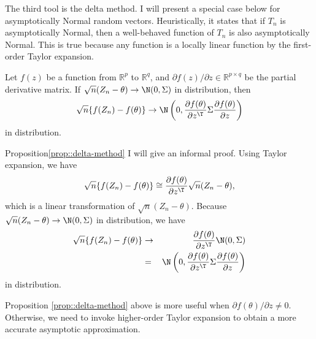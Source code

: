 The third tool is the delta method. I will present a special case below for asymptotically Normal random vectors. Heuristically, it states that if $T_n$ is asymptotically Normal, then a well-behaved function of $T_n$ is also asymptotically Normal. This is true because any function is a locally linear function by the first-order Taylor expansion. 

\begin{proposition}\label{prop::delta-method}
Let $f(z)$ be a function from $\mathbb{R}^p$ to $\mathbb{R}^q$, and $\partial f(z) / \partial z \in \mathbb{R}^{p\times q}$ be the partial derivative matrix. 
If $\sqrt{n} (Z_n - \theta) \rightarrow \N(0, \Sigma)$ in distribution, then 
$$
\sqrt{n} \{ f(Z_n) - f(\theta) \} \rightarrow \N\left( 
0, \frac{ \partial f(\theta) }{  \partial z^{\T} } \Sigma \frac{ \partial f(\theta) }{  \partial z}
\right)
$$
in distribution. 
\end{proposition}

\begin{myproof}{Proposition}{\ref{prop::delta-method}}
I will give an informal proof. Using Taylor expansion, we have
$$
\sqrt{n} \{ f(Z_n)   - f(\theta) \}\cong  \frac{ \partial f(\theta) }{  \partial z^{\T} } \sqrt{n} (Z_n - \theta),
$$
which is a linear transformation of $\sqrt{n} (Z_n - \theta)$. Because $\sqrt{n} (Z_n - \theta) \rightarrow \N(0, \Sigma)$ in distribution, we have
\begin{eqnarray*}
\sqrt{n} \{ f(Z_n)   - f(\theta) \} 
&\rightarrow &  \frac{ \partial f(\theta) }{  \partial z^{\T} }\N(0, \Sigma) \\
&=& \N\left( 
0, \frac{ \partial f(\theta) }{  \partial z^{\T} } \Sigma \frac{ \partial f(\theta) }{  \partial z}
\right)
\end{eqnarray*}
in distribution. 
\end{myproof}



Proposition \ref{prop::delta-method} above is more useful when $\partial f(\theta) /   \partial z \neq 0$. Otherwise, we need to invoke higher-order Taylor expansion to obtain a more accurate asymptotic approximation. 
 
 

